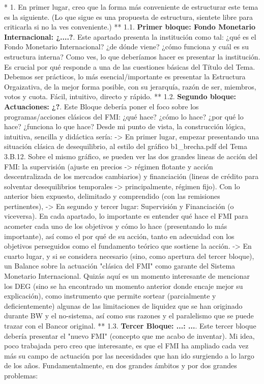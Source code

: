 \documentclass[10pt,a4paper]{article}
\begin{document}
{{    * 1. En primer lugar, creo que la forma más conveniente de estructurar este tema es la siguiente. (Lo que sigue es una propuesta de estructura, sientete libre para criticarla si no la ves conveniente.)
    ** 1.1. \textbf{Primer bloque: Fondo Monetario Internacional: ¿....?}. Este apartado presenta la institución como tal: ¿qué es el Fondo Monetario Internacional? ¿de dónde viene? ¿cómo funciona y cuál es su estructura interna? Como ves, lo que deberíamos hacer es presentar la institución. Es crucial por qué responde a una de las cuestiones básicas del Título del Tema. Debemos ser prácticos, lo más esencial/importante es presentar la Estructura Orgaizativa, de la mejor forma posible, con su jerarquía, razón de ser, miembros, votos y cuota. Fácil, intuitivo, directo y rápido. 
    ** 1.2. \textbf{Segundo bloque: Actuaciones: ¿?}. Este Bloque debería poner el foco sobre los programas/acciones clásicos del FMI: ¿qué hace? ¿cómo lo hace? ¿por qué lo hace? ¿funciona lo que hace? Desde mi punto de vista, la construcción lógica, intuitiva, sencilla y didáctica sería:
    -> En primer lugar, empezar presentando una situación clásica de desequilibrio, al estilo del gráfico b1_brecha.pdf del Tema 3.B.12. Sobre el mismo gráfico, se pueden ver las dos grandes lineas de acción del FMI: la supervisión (ajuste en precios -> régimen flotante y acción descentralizada de los mercados cambiarios) y financiación (lineas de crédito para solventar desequilibrios temporales -> principalmente, régimen fijo). Con lo anterior bien expuesto, delimitado y comprendido (con las remisiones pertinentes),
    -> En segundo y tercer lugar: Supervisión y Financiación (o viceversa). En cada apartado, lo importante es entender qué hace el FMI para acometer cada uno de los objetivos y cómo lo hace (presentando lo más importante), así como el por qué de su acción, tanto en adecuidad con los objetivos perseguidos como el fundamento teórico que sostiene la acción. 
    -> En cuarto lugar, y si se considera necesario (sino, como apertura del tercer bloque), un Balance sobre la actuación "clásica del FMI" como garante del Sistema Monetario Internacional. Quizás aquí es un momento interesante de mencionar los DEG (sino se ha encontrado un momento anterior donde encaje mejor su explicación), como instrumento que permite sortear (parcialmente y deficientemente) algunas de las limitaciones de liquidez que se han originado durante BW y el no-sistema, así como sus razones y el paralelismo que se puede trazar con el Bancor original.
    ** 1.3. \textbf{Tercer Bloque: ...: ...}. Este tercer bloque debería presentar el "nuevo FMI" (concepto que me acabo de inventar). Mi idea, poco trabajada pero creo que interesante, es que el FMI ha ampliado cada vez más su campo de actuación por las necesidades que han ido surgiendo a lo largo de los años. Fundamentalmente, en dos grandes ámbitos y por dos grandes problemas:
}}
\end{document}
